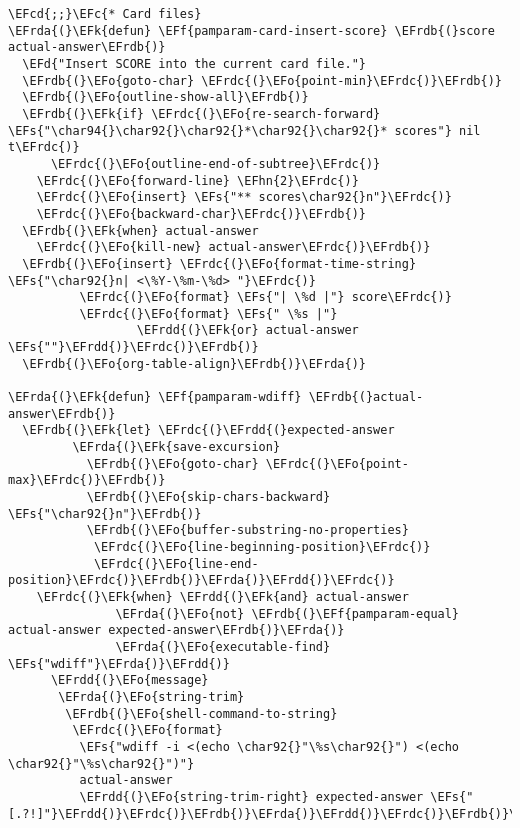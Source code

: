 \documentclass[a4wide,10pt]{article}
\newcommand{\EFc}[1]{\textcolor{EFc}{#1}} %
\newcommand{\EFcd}[1]{\textcolor{EFcd}{#1}} %
\newcommand{\EFs}[1]{\textcolor{EFs}{#1}} %
\newcommand{\EFd}[1]{\textcolor{EFd}{#1}} %
\newcommand{\EFk}[1]{\textcolor{EFk}{#1}} %
\newcommand{\EFf}[1]{\textcolor{EFf}{#1}} %
\newcommand{\EFo}[1]{\textcolor{EFo}{#1}} %
\newcommand{\EFhn}[1]{\textcolor{EFhn}{\textbf{#1}}} %
\newcommand{\EFrda}[1]{\textcolor{EFrda}{#1}} %
\newcommand{\EFrdb}[1]{\textcolor{EFrdb}{#1}} %
\newcommand{\EFrdc}[1]{\textcolor{EFrdc}{#1}} %
\newcommand{\EFrdd}[1]{\textcolor{EFrdd}{#1}} %
\begin{document}
\begin{Code}
\begin{Verbatim}
\EFcd{;;}\EFc{* Card files}
\EFrda{(}\EFk{defun} \EFf{pamparam-card-insert-score} \EFrdb{(}score actual-answer\EFrdb{)}
  \EFd{"Insert SCORE into the current card file."}
  \EFrdb{(}\EFo{goto-char} \EFrdc{(}\EFo{point-min}\EFrdc{)}\EFrdb{)}
  \EFrdb{(}\EFo{outline-show-all}\EFrdb{)}
  \EFrdb{(}\EFk{if} \EFrdc{(}\EFo{re-search-forward} \EFs{"\char94{}\char92{}\char92{}*\char92{}\char92{}* scores"} nil t\EFrdc{)}
      \EFrdc{(}\EFo{outline-end-of-subtree}\EFrdc{)}
    \EFrdc{(}\EFo{forward-line} \EFhn{2}\EFrdc{)}
    \EFrdc{(}\EFo{insert} \EFs{"** scores\char92{}n"}\EFrdc{)}
    \EFrdc{(}\EFo{backward-char}\EFrdc{)}\EFrdb{)}
  \EFrdb{(}\EFk{when} actual-answer
    \EFrdc{(}\EFo{kill-new} actual-answer\EFrdc{)}\EFrdb{)}
  \EFrdb{(}\EFo{insert} \EFrdc{(}\EFo{format-time-string} \EFs{"\char92{}n| <\%Y-\%m-\%d> "}\EFrdc{)}
          \EFrdc{(}\EFo{format} \EFs{"| \%d |"} score\EFrdc{)}
          \EFrdc{(}\EFo{format} \EFs{" \%s |"}
                  \EFrdd{(}\EFk{or} actual-answer \EFs{""}\EFrdd{)}\EFrdc{)}\EFrdb{)}
  \EFrdb{(}\EFo{org-table-align}\EFrdb{)}\EFrda{)}

\EFrda{(}\EFk{defun} \EFf{pamparam-wdiff} \EFrdb{(}actual-answer\EFrdb{)}
  \EFrdb{(}\EFk{let} \EFrdc{(}\EFrdd{(}expected-answer
         \EFrda{(}\EFk{save-excursion}
           \EFrdb{(}\EFo{goto-char} \EFrdc{(}\EFo{point-max}\EFrdc{)}\EFrdb{)}
           \EFrdb{(}\EFo{skip-chars-backward} \EFs{"\char92{}n"}\EFrdb{)}
           \EFrdb{(}\EFo{buffer-substring-no-properties}
            \EFrdc{(}\EFo{line-beginning-position}\EFrdc{)}
            \EFrdc{(}\EFo{line-end-position}\EFrdc{)}\EFrdb{)}\EFrda{)}\EFrdd{)}\EFrdc{)}
    \EFrdc{(}\EFk{when} \EFrdd{(}\EFk{and} actual-answer
               \EFrda{(}\EFo{not} \EFrdb{(}\EFf{pamparam-equal} actual-answer expected-answer\EFrdb{)}\EFrda{)}
               \EFrda{(}\EFo{executable-find} \EFs{"wdiff"}\EFrda{)}\EFrdd{)}
      \EFrdd{(}\EFo{message}
       \EFrda{(}\EFo{string-trim}
        \EFrdb{(}\EFo{shell-command-to-string}
         \EFrdc{(}\EFo{format}
          \EFs{"wdiff -i <(echo \char92{}"\%s\char92{}") <(echo \char92{}"\%s\char92{}")"}
          actual-answer
          \EFrdd{(}\EFo{string-trim-right} expected-answer \EFs{"[.?!]"}\EFrdd{)}\EFrdc{)}\EFrdb{)}\EFrda{)}\EFrdd{)}\EFrdc{)}\EFrdb{)}\EFrda{)}


\end{Verbatim}
\end{Code}
\end{document}
